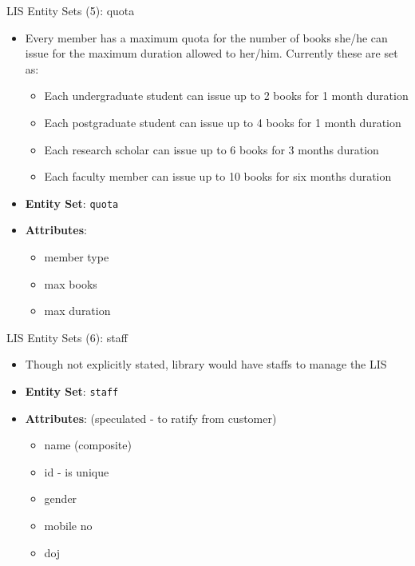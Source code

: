 \documentclass[aspectratio=169, xcolor=dvipsnames]{beamer}
\begin{document}
\begin{frame}{LIS Entity Sets (5): quota}
    \begin{itemize}
        \item Every member has a maximum quota for the number of books she/he can issue for the maximum duration allowed to her/him. Currently these are set as:
        \begin{itemize}
            \item Each undergraduate student can issue up to 2 books for 1 month duration
            \item Each postgraduate student can issue up to 4 books for 1 month duration
            \item Each research scholar can issue up to 6 books for 3 months duration
            \item Each faculty member can issue up to 10 books for six months duration
        \end{itemize}
        \item \textbf{Entity Set}: \texttt{quota}
        \item \textbf{Attributes}:
        \begin{itemize}
            \item member type
            \item max books
            \item max duration
        \end{itemize}
    \end{itemize}
\end{frame}

\begin{frame}{LIS Entity Sets (6): staff}
    \begin{itemize}
        \item Though not explicitly stated, library would have staffs to manage the LIS
        \item \textbf{Entity Set}: \texttt{staff}
        \item \textbf{Attributes}: (speculated - to ratify from customer)
        \begin{itemize}
            \item name (composite)
            \item id - is unique
            \item gender
            \item mobile no
            \item doj
        \end{itemize}
    \end{itemize}
\end{frame}
\end{document}
